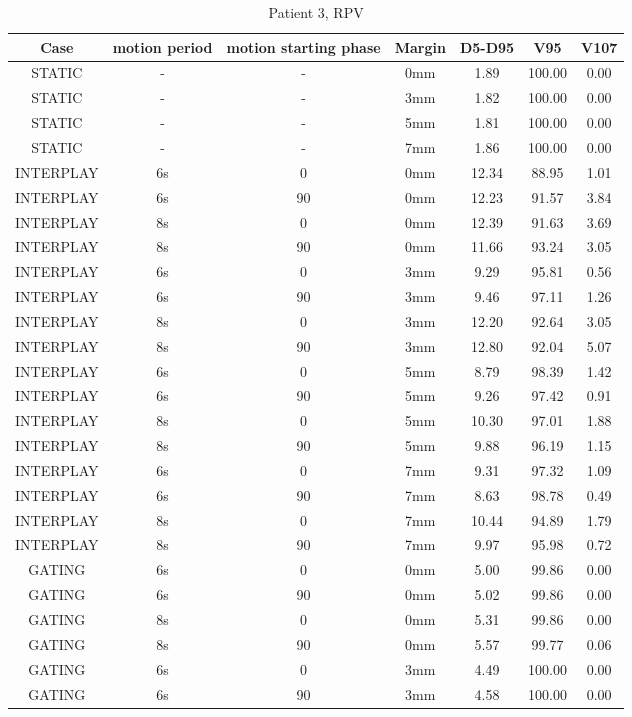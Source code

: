 \begin{table}[H]
  \centering
  \caption{Patient 3, RPV}
  \begin{tabular}{|c||c|c|c||c|c|c|}
    \hline\hline
    Case & motion period & motion starting phase & Margin & D5-D95 & V95 & V107\\
    \hline 
STATIC & - & - & 0mm & 1.89 & 100.00 & 0.00 \\
STATIC & - & - & 3mm & 1.82 & 100.00 & 0.00 \\
STATIC & - & - & 5mm & 1.81 & 100.00 & 0.00 \\
STATIC & - & - & 7mm & 1.86 & 100.00 & 0.00 \\
INTERPLAY & 6s & 0 & 0mm & 12.34 & 88.95 & 1.01 \\
INTERPLAY & 6s & 90 & 0mm & 12.23 & 91.57 & 3.84 \\
INTERPLAY & 8s & 0 & 0mm & 12.39 & 91.63 & 3.69 \\
INTERPLAY & 8s & 90 & 0mm & 11.66 & 93.24 & 3.05 \\
INTERPLAY & 6s & 0 & 3mm & 9.29 & 95.81 & 0.56 \\
INTERPLAY & 6s & 90 & 3mm & 9.46 & 97.11 & 1.26 \\
INTERPLAY & 8s & 0 & 3mm & 12.20 & 92.64 & 3.05 \\
INTERPLAY & 8s & 90 & 3mm & 12.80 & 92.04 & 5.07 \\
INTERPLAY & 6s & 0 & 5mm & 8.79 & 98.39 & 1.42 \\
INTERPLAY & 6s & 90 & 5mm & 9.26 & 97.42 & 0.91 \\
INTERPLAY & 8s & 0 & 5mm & 10.30 & 97.01 & 1.88 \\
INTERPLAY & 8s & 90 & 5mm & 9.88 & 96.19 & 1.15 \\
INTERPLAY & 6s & 0 & 7mm & 9.31 & 97.32 & 1.09 \\
INTERPLAY & 6s & 90 & 7mm & 8.63 & 98.78 & 0.49 \\
INTERPLAY & 8s & 0 & 7mm & 10.44 & 94.89 & 1.79 \\
INTERPLAY & 8s & 90 & 7mm & 9.97 & 95.98 & 0.72 \\
GATING & 6s & 0 & 0mm & 5.00 & 99.86 & 0.00 \\
GATING & 6s & 90 & 0mm & 5.02 & 99.86 & 0.00 \\
GATING & 8s & 0 & 0mm & 5.31 & 99.86 & 0.00 \\
GATING & 8s & 90 & 0mm & 5.57 & 99.77 & 0.06 \\
GATING & 6s & 0 & 3mm & 4.49 & 100.00 & 0.00 \\
GATING & 6s & 90 & 3mm & 4.58 & 100.00 & 0.00 \\

\end{tabular}
\end{table}
